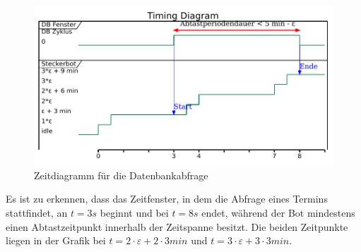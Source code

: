 \begin{figure}[htbp]
	\centering
	\includegraphics[width=1\textwidth,clip]{img/query.pdf}
	\caption{Zeitdiagramm für die Datenbankabfrage}
	\label{querytiming}
\end{figure}

Es ist zu erkennen, dass das Zeitfenster, in dem die Abfrage eines Termins stattfindet, an $t=3s$ beginnt und bei $t=8s$ endet, während der Bot mindestens einen Abtastzeitpunkt innerhalb der Zeitspanne besitzt. Die beiden Zeitpunkte liegen in der Grafik bei $t=2 \cdot \varepsilon + 2\cdot 3min$ und $t=3\cdot \varepsilon + 3\cdot 3min$.



